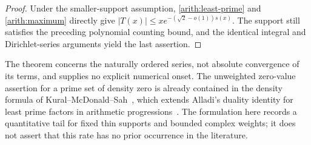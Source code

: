 \begin{proof}
Under the smaller-support assumption,
\eqref{arith:least-prime} and \eqref{arith:maximum} directly give
$|T(x)|\le x e^{-(\sqrt2-o(1))s(x)}$.
The support still satisfies the preceding polynomial counting bound,
and the identical integral and Dirichlet-series arguments yield the
last assertion.
\end{proof}

The theorem concerns the naturally ordered series, not absolute convergence
of its terms, and supplies no explicit numerical onset. The unweighted
zero-value assertion for a prime set of density zero is already contained in
the density formula of Kural--McDonald--Sah~\cite[Theorem~1.1]{kms}, which extends Alladi's duality identity for least prime factors in arithmetic progressions~\cite{alladi1977}.
The formulation here records a quantitative tail for fixed thin supports
and bounded complex weights; it does not assert that this rate has no prior
occurrence in the literature.
